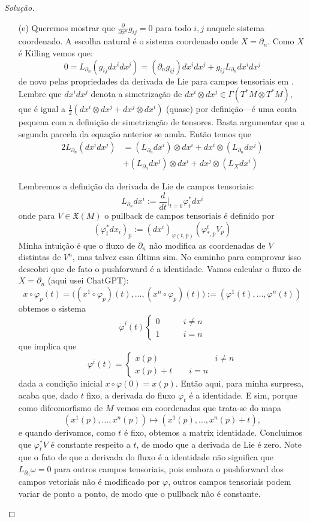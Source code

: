 \begin{proof}[Solução]
\begin{enumerate}[label=(\alph*)]
\item[(e)] Queremos mostrar que \(\frac{\partial }{\partial x^n}g_{ij}=0\) para todo \(i,j\) naquele sistema coordenado. A escolha natural é o sistema coordenado onde \(X=\partial_n\). Como \(X\) é Killing vemos que:
	\[0=L_{\partial_n}(g_{ij}dx^idx^j)=(\partial_ng_{ij})dx^idx^j+g_{ij}L_{\partial_n}dx^idx^j\]
de novo pelas propriedades da derivada de Lie para campos tensoriais em \cite{les}. Lembre que \(dx^i dx^j\) denota a simetrização de \(dx^i \otimes dx^j \in \Gamma(T^*M \otimes T^*M)\), que  é igual a \(\frac{1}{2}(dx^i \otimes dx^j+dx^j\otimes dx^i)\) (quase) por definição---é uma conta pequena com a definição de simetrização de tensores. Basta argumentar que a segunda parcela da equação anterior se anula. Então temos que
\begin{align*}2L_{\partial_n}(dx^i dx^j)&=(L_{\partial_n}dx^i)\otimes dx^i+ dx^i \otimes (L_{\partial_n}dx^j)\\&+(L_{\partial_n}dx^j) \otimes dx^i+dx^j \otimes (L_X dx^i)\end{align*}

Lembremos a definição da derivada de Lie de campos tensoriais:
\[L_{\partial_n}dx^i:=\frac{d}{dt}\Big|_{t=0}\varphi^*_t dx^i\]
onde para \(V \in \mathfrak{X}(M)\) o pullback de campos tensoriais é definido por 
\[(\varphi^*_tdx_i)_p:=(dx^i)_{\varphi(t,p)}(\varphi^t_{*,p}V_p)\]
Minha intuição é que o fluxo de \(\partial_n\) não modifica as coordenadas de \(V\) distintas de \(V^n\), mas talvez essa última sim. No caminho para comprovar isso descobri que de fato o pushforward é a identidade. Vamos calcular o fluxo de \(X=\partial_n\) (aqui usei ChatGPT):
\[x \circ \varphi_p(t)=\Big((x^1 \circ \varphi_p)(t),\ldots,(x^n \circ \varphi_p)(t)\Big):=(\varphi^1(t),\ldots,\varphi^n(t))\]
obtemos o sistema
\[\dot \varphi^i(t)\begin{cases}
	0\qquad & i\neq  n\\
	1\qquad & i=n
\end{cases}\]
que implica que
\[\varphi^i(t)=\begin{cases}
	x(p)\qquad & i\neq n\\
	x(p)+t\qquad i=n&
\end{cases}\]
dada a condição inicial \(x \circ\varphi(0)=x(p)\). Então aqui, para minha surpresa, acaba que, dado \(t\) fixo, a derivada do fluxo \(\varphi_t\) é a identidade. E sim, porque como difeomorfismo de  \(M\) vemos em coordenadas que trata-se do mapa
\[(x^1(p),\ldots,x^n(p))\longmapsto (x^1(p),\ldots,x^n(p)+t),\]
e quando derivamos, como \(t\) é fixo, obtemos a matrix identidade. Concluimos que \(\varphi^*_{t}V\) é constante respeito a \(t\), de modo que a derivada de Lie é zero. Note que o fato de que a derivada do fluxo é a identidade não significa que \(L_{\partial_n}\omega=0\) para outros campos tensoriais, pois embora o pushforward dos campos vetoriais não é modificado por \(\varphi\), outros campos tensoriais podem variar de ponto a ponto, de modo que o pullback não é constante.
\end{enumerate}
\end{proof}


